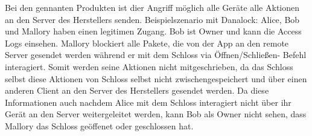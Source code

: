 \begin{itemize}[leftmargin=0cm,label={}]
                Bei den gennanten Produkten ist dier Angriff möglich alle Geräte alle Aktionen an den Server des Herstellers senden.
                Beispielszenario mit Danalock: Alice, Bob und Mallory haben einen legitimen Zugang.
                Bob ist Owner und kann die Access Logs einsehen.
                Mallory blockiert alle Pakete, die von der App an den remote Server gesendet werden während er mit dem Schloss via Öffnen/\-Schließen- Befehl interagiert. 
                Somit werden seine Aktionen nicht mitgeschrieben, da das Schloss selbst diese Aktionen von Schloss selbst nicht zwischengespeichert und über einen anderen Client an den Server des Herstellers gesendet werden.
                Da diese Informationen auch nachdem Alice mit dem Schloss interagiert nicht über ihr Gerät an den Server weitergeleitet werden, kann Bob als Owner nicht sehen, dass Mallory das Schloss geöffenet oder geschlossen hat.
        \end{itemize}
        
